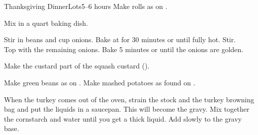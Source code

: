 \documentclass[../Cookbook.tex]{subfiles}
\begin{document}
\begin{recipe}{Thanksgiving Dinner}{Lots}{5--6 hours}
\newstep
Make rolls as on .

Mix in a  quart baking dish.

Stir in beans and  cup onions. Bake at  for 30 minutes or until fully hot. Stir.\\
Top with the remaining onions. Bake 5 minutes or until the onions are golden.

\newstep
Make the custard part of the squash custard ().

\newstep
Make green beans as on .
Make mashed potatoes as found on .

When the turkey comes out of the oven, strain the stock and the turkey browning bag and put the liquids in a saucepan. This will become the gravy. Mix together the cornstarch and water until you get a thick liquid. Add slowly to the gravy base.

\end{recipe}
\end{document}
